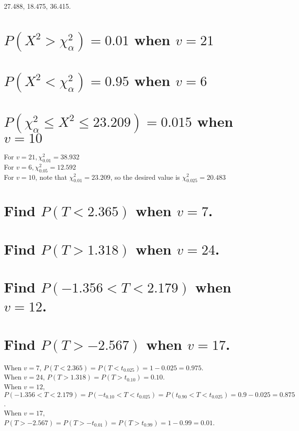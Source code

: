 \documentclass[answers]{exam}
\begin{document}
\begin{questions}
\begin{solution}
	27.488, 18.475, 36.415.
\end{solution}


\begin{parts}
	\part{$P(X^2>\chi_\alpha^2) = 0.01$ when $v=21$}
	\part{$P(X^2<\chi_\alpha^2) = 0.95$ when $v=6$}
	\part{$P(\chi_\alpha^2 \leq X^2 \leq 23.209) = 0.015$ when $v=10$}
\end{parts}

\begin{solution}
	For $v=21, \chi_{0.01}^2 = 38.932$ \\
	For $v=6, \chi_{0.05}^2 = 12.592$ \\
	For $v=10$, note that $\chi_{0.01}^2 = 23.209$, so the desired value is $\chi_{0.025}^2 = 20.483$
\end{solution}

\question{}

\begin{parts}
	\part{Find $P(T<2.365)$ when $v=7$.}
	\part{Find $P(T>1.318)$ when $v=24$.}
	\part{Find $P(-1.356<T<2.179)$ when $v=12$.}
	\part{Find $P(T>-2.567)$ when $v=17$.}
\end{parts}

\begin{solution}
	When $v=7$, $P(T<2.365) = P(T<t_{0.025}) = 1 - 0.025 = 0.975$. \\
	When $v=24$, $P(T>1.318) = P(T>t_{0.10}) = 0.10$. \\
	When $v=12$, $P(-1.356<T<2.179) = P(-t_{0.10}<T<t_{0.025}) = P(t_{0.90}<T<t_{0.025}) = 0.9-0.025 = 0.875$. \\
	When $v=17$, $P(T>-2.567) = P(T>-t_{0.01}) = P(T>t_{0.99}) = 1 - 0.99 = 0.01$.
\end{solution}


\end{questions}
\end{document}
